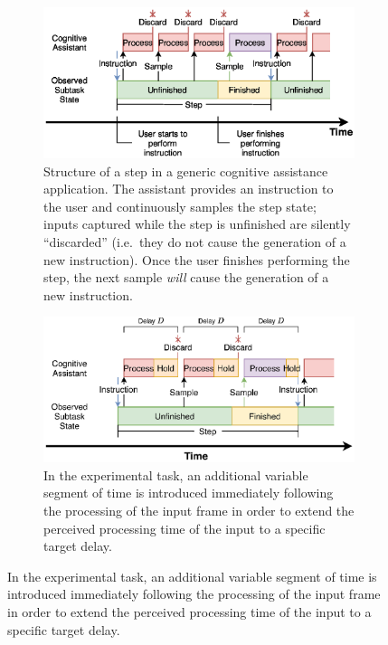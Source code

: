 \begin{figure}[h]
  \centering
  \begin{subfigure}[t]{.49\textwidth}
    \centering
    \includegraphics[width=\textwidth]{publications/2021ImpactDelayedResponse/Fig4a.eps}
    \caption{Structure of a step in a generic cognitive assistance application. 
    The assistant provides an instruction to the user and continuously samples the step state; inputs captured while the step is unfinished are silently ``discarded'' (i.e.\ they do not cause the generation of a new instruction).
    Once the user finishes performing the step, the next sample \emph{will} cause the generation of a new instruction.
    }
    \label{fig:cogassist:step}
  \end{subfigure}%
  \hfill%
  \begin{subfigure}[t]{.49\textwidth}
    \centering
    \includegraphics[width=\textwidth]{publications/2021ImpactDelayedResponse/Fig4b.eps}
    \caption{In the experimental task, an additional variable segment of time is introduced immediately following the processing of the input frame in order to extend the perceived processing time of the input to a specific target delay.}%
    \label{fig:cogassist:step:delay}

\end{subfigure}
\end{figure}
